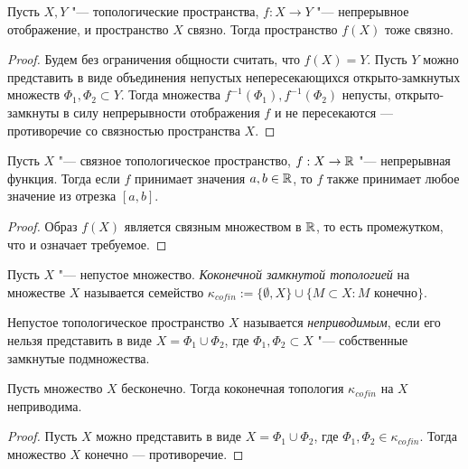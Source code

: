 \begin{theorem}\label{theoremmain}
	Пусть $X, Y$ "--- топологические пространства, $f : X \to Y$ "--- непрерывное отображение, и пространство $X$ связно. Тогда пространство $f(X)$ тоже связно.
\end{theorem}

\begin{proof}
	Будем без ограничения общности считать, что $f(X) = Y$. Пусть $Y$ можно представить в виде объединения непустых непересекающихся открыто-замкнутых множеств $\Phi_1, \Phi_2 \subset Y$. Тогда множества $f^{-1}(\Phi_1), f^{-1}(\Phi_2)$ непусты, открыто-замкнуты в силу непрерывности отображения $f$ и не пересекаются --- противоречие со связностью пространства $X$.
\end{proof}

\begin{corollary}
	Пусть $X$ "--- связное топологическое пространство, $f : X \to \mathbb{R}$ "--- непрерывная функция. Тогда если $f$ принимает значения $a, b \in \mathbb{R}$, то $f$ также принимает любое значение из отрезка $[a, b]$.
\end{corollary}

\begin{proof}
	Образ $f(X)$ является связным множеством в $\mathbb{R}$, то есть промежутком, что и означает требуемое.
\end{proof}

\begin{definition}
	Пусть $X$ "--- непустое множество. \textit{Коконечной замкнутой топологией} на множестве $X$ называется семейство $\kappa_{cofin} := \{\emptyset, X\} \cup \{M \subset X : M \text{ конечно}\}$.
\end{definition}

\begin{definition}
	Непустое топологическое пространство $X$ называется \textit{неприводимым}, если его нельзя представить в виде $X = \Phi_1 \cup \Phi_2$, где $\Phi_1, \Phi_2 \subset X$ "--- собственные замкнутые подмножества.
\end{definition}

\begin{theorem}
	Пусть множество $X$ бесконечно. Тогда коконечная топология $\kappa_{cofin}$ на $X$ неприводима.
\end{theorem}

\begin{proof}
	Пусть $X$ можно представить в виде $X = \Phi_1 \cup \Phi_2$, где $\Phi_1, \Phi_2 \in \kappa_{cofin}$. Тогда множество $X$ конечно --- противоречие.
\end{proof}

